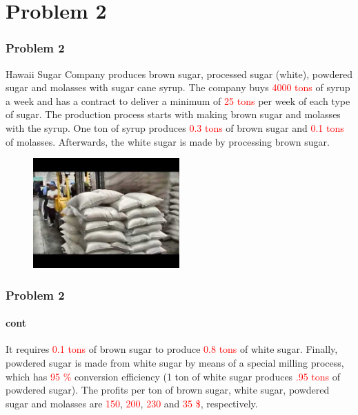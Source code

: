 \documentclass[10pt,svgnames,fragile]{beamer}
\begin{document}
\section{Problem 2}
\label{sec:org924d969}
\begin{frame}[label={sec:org9c62e72}]{}
\frametitle{Problem 2}


Hawaii Sugar Company produces brown sugar, processed sugar (white), powdered sugar and molasses with sugar cane syrup. The company buys \textcolor{red}{4000 tons} of syrup a week and has a contract to deliver a minimum of \textcolor{red}{25 tons} per week of each type of sugar. The production process starts with making brown sugar and molasses with the syrup. One ton of syrup produces \textcolor{red}{0.3 tons} of brown sugar and \textcolor{red}{0.1 tons} of molasses. Afterwards, the white sugar is made by processing brown sugar.

\begin{figure}
\includegraphics[width=0.5\textwidth]{images/B.jpg}
\end{figure}


\end{frame}


\begin{frame}[label={sec:org9c62e72}]{}
\frametitle{Problem 2}
\framesubtitle{cont}

It requires \textcolor{red}{0.1 tons} of brown sugar to produce \textcolor{red}{0.8 tons} of white sugar. Finally, powdered sugar is made from white sugar by means of a special milling process, which has \textcolor{red}{95 \%} conversion efficiency (1 ton of white sugar produces \textcolor{red}{.95 tons} of powdered sugar). The profits per ton of brown sugar, white sugar, powdered sugar and molasses are \textcolor{red}{150}, \textcolor{red}{200}, \textcolor{red}{230} and \textcolor{red}{35 \$}, respectively.



\end{frame}
\end{document}
